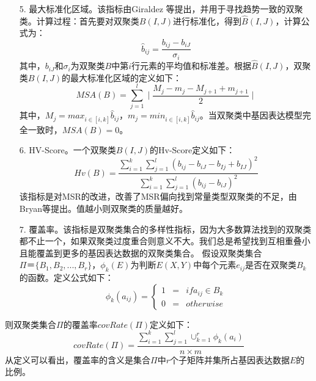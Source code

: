 \begin{enumerate}
    \item[5.] 最大标准化区域。该指标由Giraldez 等提出，并用于寻找趋势一致的双聚类。计算过程：首先要对双聚类$B(I,J)$进行标准化，得到$\hat{B}(I,J)$，计算公式为：
    \begin{equation}
      \hat{b}_{ij} = \frac{b_{ij}-b_{iJ}}{\sigma_i}
    \end{equation}
    \hspace{2em} 其中，$b_{iJ}$和$\sigma_i$为双聚类$B$中第$i$行元素的平均值和标准差。根据$\hat{B}(I,J)$，双聚类$B(I,J)$的最大标准化区域的定义如下：
    \begin{equation}
      MSA(B) = \sum_{j=1}^l \mid \frac{M_j-m_j-M_{j+1}+m_{j+1}}{2}\mid
    \end{equation}
    \hspace{2em} 其中，$M_j=max_{i\in [i,k]}\hat{b}_{ij}$，$m_j=min_{i\in [i,k]}\hat{b}_{ij}$。当双聚类中基因表达模型完全一致时，$MSA(B)=0$。

    \item[6.] HV-Score。一个双聚类$B(I, J)$的Hv-Score定义如下：
    \begin{equation}
     Hv(B) = \frac{\sum_{i=1}^k \sum_{j=1}^l(b_{ij}-b_{iJ}-b_{Ij}+b_{IJ})^2}{\sum_{i=1}^k \sum_{j=1}^l(b_{ij}-b_{iJ})^2}
    \end{equation}
    该指标是对MSR的改进，改善了MSR偏向找到常量类型双聚类的不足，由Bryan等提出。值越小则双聚类的质量越好。

    \item[7.] 覆盖率。该指标是双聚类集合的多样性指标，因为大多数算法找到的双聚类都不止一个，如果双聚类过度重合则意义不大。我们总是希望找到互相重叠小且能覆盖到更多的基因表达数据的双聚类集合。 假设双聚类集合$\Pi＝\{B_1,B_2,...,B_r\}$，$\phi_k(E)$为判断$E(X,Y)$中每个元素$e_{ij}$是否在双聚类$B_k$的函数。定义公式如下：
    \begin{equation}
    \phi_k(a_{ij})  = \left\{
      \begin{aligned}
       1 & = & if a_{ij} \in B_k \\
       0 & = & otherwise 
      \end{aligned}
    \right.
    \end{equation}
  \end{enumerate}
  \hspace{2em}则双聚类集合$\Pi$的覆盖率$covRate(\Pi)$定义如下：
  \begin{equation}
   covRate(\Pi) = \frac{\sum_{i=1}^k\sum_{j=1}^l\cup_{k=1}^r\phi_k(a_i)}{n \times m} 
  \end{equation}
  \hspace{2em}从定义可以看出，覆盖率的含义是集合$\Pi$中$r$个子矩阵并集所占基因表达数据$E$的比例。


